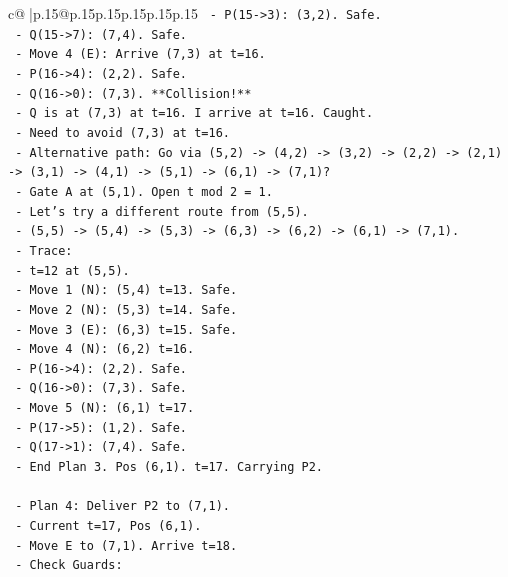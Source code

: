 \documentclass{article}
\begin{document}
{\begin{supertabular}{c@{$\;$}|p{.15\linewidth}@{}p{.15\linewidth}p{.15\linewidth}p{.15\linewidth}p{.15\linewidth}p{.15\linewidth}}
{{{\texttt{         {-} P(15{-}>3): (3,2). Safe.} \\
\texttt{         {-} Q(15{-}>7): (7,4). Safe.} \\
\texttt{       {-} Move 4 (E): Arrive (7,3) at t=16.} \\
\texttt{         {-} P(16{-}>4): (2,2). Safe.} \\
\texttt{         {-} Q(16{-}>0): (7,3). **Collision!**} \\
\texttt{         {-} Q is at (7,3) at t=16. I arrive at t=16. Caught.} \\
\texttt{     {-} Need to avoid (7,3) at t=16.} \\
\texttt{     {-} Alternative path: Go via (5,2) {-}> (4,2) {-}> (3,2) {-}> (2,2) {-}> (2,1) {-}> (3,1) {-}> (4,1) {-}> (5,1) {-}> (6,1) {-}> (7,1)?} \\
\texttt{       {-} Gate A at (5,1). Open t mod 2 = 1.} \\
\texttt{       {-} Let's try a different route from (5,5).} \\
\texttt{       {-} (5,5) {-}> (5,4) {-}> (5,3) {-}> (6,3) {-}> (6,2) {-}> (6,1) {-}> (7,1).} \\
\texttt{       {-} Trace:} \\
\texttt{         {-} t=12 at (5,5).} \\
\texttt{         {-} Move 1 (N): (5,4) t=13. Safe.} \\
\texttt{         {-} Move 2 (N): (5,3) t=14. Safe.} \\
\texttt{         {-} Move 3 (E): (6,3) t=15. Safe.} \\
\texttt{         {-} Move 4 (N): (6,2) t=16.} \\
\texttt{           {-} P(16{-}>4): (2,2). Safe.} \\
\texttt{           {-} Q(16{-}>0): (7,3). Safe.} \\
\texttt{         {-} Move 5 (N): (6,1) t=17.} \\
\texttt{           {-} P(17{-}>5): (1,2). Safe.} \\
\texttt{           {-} Q(17{-}>1): (7,4). Safe.} \\
\texttt{         {-} End Plan 3. Pos (6,1). t=17. Carrying P2.} \\
\\ 
\texttt{   {-} Plan 4: Deliver P2 to (7,1).} \\
\texttt{     {-} Current t=17, Pos (6,1).} \\
\texttt{     {-} Move E to (7,1). Arrive t=18.} \\
\texttt{     {-} Check Guards:} \\
}}}
\end{supertabular}}
\end{document}
